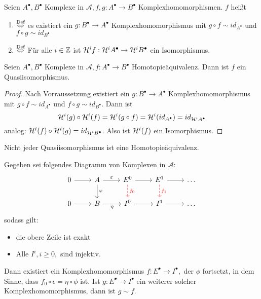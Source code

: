 \begin{df}\label{7.12}
	Seien $A^{\bullet}, B^{\bullet} $ Komplexe in $\mathcal{A}, f,g: A^{\bullet} \to B^{\bullet} $ Komplexhomomorphismen. $f$ heißt
	\begin{enumerate}
	\item[]  $\overset{\text{Def}}{\Leftrightarrow} $ es existiert ein $g: B^{\bullet} \to A^{\bullet} $ Komplexhomomorphismus mit $g \circ f \sim id_{A^{\bullet}} $ und $f \circ g \sim id_{B^{\bullet}}$
	\item[]  $\overset{\text{Def}}{\Leftrightarrow} $ Für alle $i \in \mathbb{Z} $ ist $\mathcal{H}^if:  \mathcal{H}^iA^{\bullet} \to \mathcal{H}^iB^{\bullet} $ ein Isomorphismus.
\end{enumerate}
\end{df}
\begin{bem}\label{7.13}
	Seien $A^{\bullet}, B^{\bullet} $ Komplexe in $\mathcal{A}, f: A^{\bullet} \to B^{\bullet} $ Homotopieäquivalenz. Dann ist $f$ ein Quasiisomorphismus. 
\end{bem}
\begin{proof}
	Nach Vorraussetzung existiert ein $g: B^{\bullet} \to A^{\bullet} $ Komplexhomomorphismus mit $g \circ f \sim id_{A^{\bullet}} $ und $f \circ g \sim id_{B^{\bullet}}$. Dann ist
	$$\mathcal{H}^i(g) \circ \mathcal{H}^i(f) = \mathcal{H}^i(g \circ f ) = \mathcal{H}^i(id_{A^{\bullet}}) = id_{\mathcal{H}^iA^{\bullet}}$$
	analog: $\mathcal{H}^i(f) \circ \mathcal{H}^i(g) = id_{\mathcal{H}^iB^{\bullet}}$. Also ist  $\mathcal{H}^i(f) $ ein Isomorphismus.
\end{proof}
\begin{anm}
	Nicht jeder Quasiisomorphismus ist eine Homotopieäquivalenz.
\end{anm}
\begin{sa}\label{7.14}
	Gegeben sei folgendes Diagramm von Komplexen in $\mathcal{A} $: \\
	$$\begin{tikzcd}
	0 \arrow{r} & A \arrow{d}{\phi} \arrow{r}{\epsilon}& E^0 \arrow[dashed,red]{d}{f_0}\arrow{r} & E^1 \arrow[dashed,red]{d}{f_1} \arrow{r} & \ldots\\
	0 \arrow{r} & B \arrow[swap]{r}{\eta} & I^0 \arrow[swap]{r} & I^1 \arrow{r} & \ldots
	\end{tikzcd}$$
	sodass gilt: \begin{itemize}
		\item die obere Zeile ist exakt
		\item Alle $I^i, i \geq 0,$ sind injektiv.
	\end{itemize}
	Dann existiert ein Komplexhomomorphismus $f: E^{\bullet} \to I^{\bullet}, $ der $\phi$ fortsetzt, in dem Sinne, dass $ f_0 \circ \epsilon = \eta \circ \phi $ ist. Ist $g:E^{\bullet} \to I^{\bullet} $ ein weiterer solcher Komplexhomomorphismus, dann ist $g \sim f$.
\end{sa}
